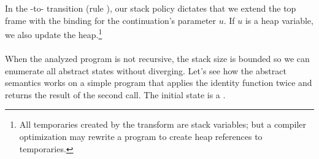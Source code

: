 \documentclass{LMCS}
\theoremstyle{definition} \newtheorem{property}[thm]{Property}
\begin{document}
In the \dacapply-to-\daeval{} transition (rule ), our stack policy
dictates that we extend the top frame with the binding for the continuation's
parameter $u$. 
If $u$ is a heap variable, we also update the heap.\footnote{All temporaries
created by the \cps{} transform are stack variables; but a compiler 
optimization may rewrite a program to create heap references to temporaries.}

\paragraph{}
When the analyzed program is not recursive, the stack size is bounded so we can
enumerate all abstract states without diverging.
Let's see how the abstract semantics works on a simple program that applies the
identity function twice and returns the result of the second call.
The initial state \ainitstate{} is a \dauapply.
\end{document}
